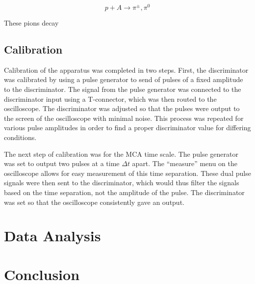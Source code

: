 \documentclass[%
 aip,
 amsmath,amssymb,
 reprint,%
floatfix,
]{revtex4-1}
\begin{document}
\begin{equation}
	p + A \rightarrow \pi^{\pm}, \pi^0
\end{equation}

These pions decay

\subsection{Calibration}

Calibration of the apparatus was completed in two steps. First, the discriminator was calibrated by using a pulse generator to send of pulses of a fixed amplitude to the discriminator. The signal from the pulse generator was connected to the discriminator input using a T-connector, which was then routed to the oscilloscope. The discriminator was adjusted so that the pulses were output to the screen of the oscilloscope with minimal noise. This process was repeated for various pulse amplitudes in order to find a proper discriminator value for differing conditions.

The next step of calibration was for the MCA time scale. The pulse generator was set to output two pulses at a time $\Delta t$ apart. The “measure” menu on the oscilloscope allows for easy measurement of this time separation. These dual pulse signals were then sent to the discriminator, which would thus filter the signals based on the time separation, not the amplitude of the pulse. The discriminator was set so that the oscilloscope consistently gave an output.

\section{\label{sec:level4}Data Analysis}


\section{\label{sec:level5}Conclusion}


\nocite{*}
\end{document}
